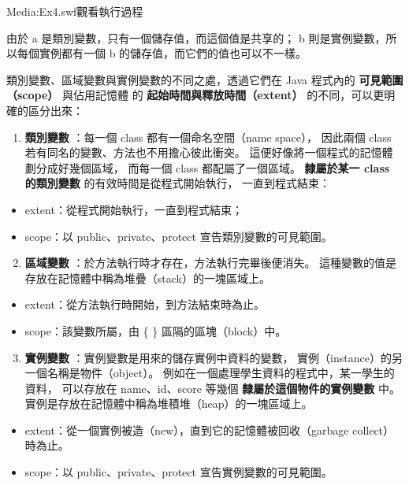 \documentclass[a4paper,12pt,english]{sphinxmanual}
\begin{document}
Media:Ex4.swf\textbar{}觀看執行過程

由於 a 是類別變數，只有一個儲存值，而這個值是共享的；
b 則是實例變數，所以每個實例都有一個 b 的儲存值，而它們的值也可以不一樣。

類別變數、區域變數與實例變數的不同之處，透過它們在 Java 程式內的 \textbf{可見範圍（scope）} 與佔用記憶體
的 \textbf{起始時間與釋放時間（extent）} 的不同，可以更明確的區分出來：
\begin{enumerate}
\item {} 
\textbf{類別變數} ：每一個 class 都有一個命名空間（name space），
因此兩個 class 若有同名的變數、方法也不用擔心彼此衝突。
這便好像將一個程式的記憶體劃分成好幾個區域，
而每一個 class 都配屬了一個區域。
\textbf{隸屬於某一 class 的類別變數} 的有效時間是從程式開始執行，
一直到程式結束：

\end{enumerate}
\begin{itemize}
\item {} 
extent：從程式開始執行，一直到程式結束；

\item {} 
scope：以 public、private、protect 宣告類別變數的可見範圍。

\end{itemize}
\begin{enumerate}
\setcounter{enumi}{1}
\item {} 
\textbf{區域變數} ：於方法執行時才存在，方法執行完畢後便消失。
這種變數的值是存放在記憶體中稱為堆疊（stack）的一塊區域上。

\end{enumerate}
\begin{itemize}
\item {} 
extent：從方法執行時開始，到方法結束時為止。

\item {} 
scope：該變數所屬，由 \{ \} 區隔的區塊（block）中。

\end{itemize}
\begin{enumerate}
\setcounter{enumi}{2}
\item {} 
\textbf{實例變數} ：實例變數是用來的儲存實例中資料的變數，
實例（instance）的另一個名稱是物件（object）。
例如在一個處理學生資料的程式中，某一學生的資料，
可以存放在 name、id、score 等幾個 \textbf{隸屬於這個物件的實例變數} 中。
實例是存放在記憶體中稱為堆積堆（heap）的一塊區域上。

\end{enumerate}
\begin{itemize}
\item {} 
extent：從一個實例被造（new），直到它的記憶體被回收（garbage collect）時為止。

\item {} 
scope：以 public、private、protect 宣告實例變數的可見範圍。

\end{itemize}
\end{document}
